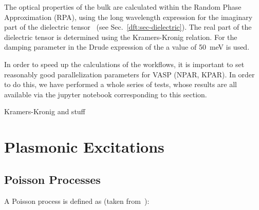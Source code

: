 \begin{refsection}
The optical properties of the bulk are calculated within the Random Phase 
Approximation (RPA), using the long wavelength expression for the imaginary 
part of the dielectric tensor~\cite{Gajdos2006, Harl2007} 
(see Sec.~\ref{dft:sec-dielectric}). The real part of the dielectric tensor is 
determined using the Kramers-Kronig  relation. For the damping parameter in 
the Drude expression of the  a value of 50~\si{\milli\electronvolt} is used.


In order to speed up the calculations of the workflows, it is important to set 
reasonably good parallelization parameters for VASP (NPAR, KPAR). In order to 
do this, we have performed a whole series of tests, whose results are all 
available via the jupyter notebook corresponding to this section. 
 

Kramers-Kronig and stuff 

\chapter{Plasmonic Excitations} \label{appendix:sec-plasmons} 

\section{Poisson Processes} \label{sec:appendix-poisson} 

A Poisson process is defined as (taken from~\cite{MITopencourseware}):


\end{refsection}
